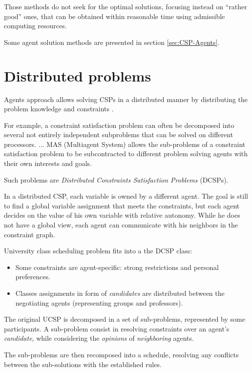 \documentclass[ThesisDoc]{subfiles}
\begin{document}
\medskip

Those methods do not seek for the optimal solutions, focusing instead on
``rather good'' ones, that can be obtained within reasonable time using admissible
computing resources.

\bigskip

\noindent
Some agent solution methods are presented in section \ref{sec:CSP-Agents}.





\section{Distributed problems}
Agents approach allows solving CSPs in a distributed manner by distributing
the problem knowledge and constraints
\cite{DCSPagent1998, DCSP2013, CSPagent2014, MAS, MAS-Survey}.

\begin{displayquote} %
  For example, a constraint satisfaction problem can often be
  decomposed into several not entirely independent
  subproblems that can be solved on different processors. $\dots$
  MAS (Multiagent System) allows the sub-problems of a constraint satisfaction
  problem to be subcontracted to different problem solving agents with their own
  interests and goals.
\end{displayquote}

\noindent
Such problems are \emph{Distributed Constraints Satisfaction Problems} (DCSPs).
\begin{displayquote} %
  In a distributed CSP, each variable is owned by a different agent. The goal is
  still to find a global variable assignment that meets the constraints, but each agent
  decides on the value of his own variable with relative autonomy. While he does
  not have a global view, each agent can communicate with his neighbors in the
  constraint graph.
\end{displayquote}


University class scheduling problem fits into a the DCSP class:
\begin{itemize}
  \item Some constraints are agent-specific: strong restrictions and
        personal preferences.
  \item Classes assignments in form of \emph{candidates} are distributed between
        the negotiating agents (representing groups and professors).
\end{itemize}

The original UCSP is decomposed in a set of sub-problems, represented by some
participants. A sub-problem consist in resolving constraints over an agent's
\emph{candidate}, while considering the \emph{opinions} of \emph{neighboring}
agents.

The sub-problems are then recomposed into a schedule, resolving any conflicts
between the sub-solutions with the established rules.
\end{document}

